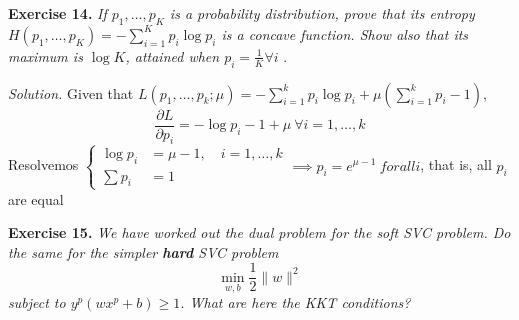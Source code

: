 \documentclass[11pt]{article}
\begin{document}
\textbf{Exercise 14. }\emph{If \( p_1,\dots,p_K \) is a probability distribution, prove that its entropy \( H(p_1, \dots, p_K) = - \sum_{i=1}^K p_i \log p_i\) is a concave function. Show also that its maximum is \( \log K \), attained when \( p_i = \frac{1}{K} \forall i \) }.

\emph{Solution. } Given that \( L(p_1,\dots, p_k; \mu) = - \sum_{i=1}^k p_i \log p_i + \mu\left(\sum_{i=1}^k p_i - 1\right) \),
\[
     \frac{\partial L}{\partial p_i} = -\log p_i - 1 + \mu \ \forall i=1,\dots,k
\]
Resolvemos \( \begin{cases}
    \log p_i &= \mu - 1, \quad i=1,\dots,k\\
    \sum p_i &= 1
\end{cases}  \implies p_i = e^{\mu - 1} \ forall i\), that is, all \( p_i \) are equal

\textbf{Exercise 15. }\emph{We have worked out the dual problem for the soft SVC problem. Do the same for the simpler \textbf{hard} SVC problem}
\[
\min_{w,b} \frac{1}{2}\|w\|^2     
\]
\emph{subject to \( y^p(wx^p + b) \geq 1 \). What are here the KKT conditions? }
\end{document}
